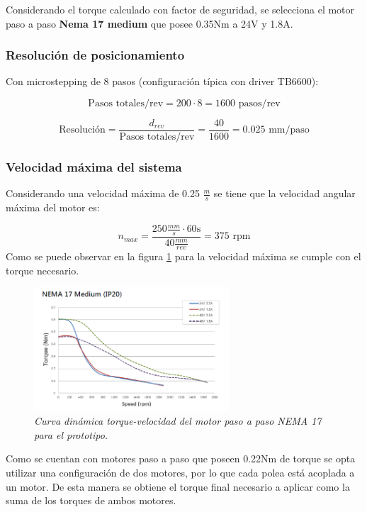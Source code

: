 Considerando el torque calculado con factor de seguridad, se selecciona el motor paso a paso  \textbf{Nema 17 medium} que posee  0.35Nm a 24V y 1.8A. 

\subsubsection{Resolución de posicionamiento}

Con microstepping de 8 pasos (configuración típica con driver TB6600):

\begin{equation}
    \text{Pasos totales/rev} = 200 \cdot 8 = 1600 \text{ pasos/rev}
\end{equation}

\begin{equation}
    \text{Resolución} = \frac{d_{rev}}{\text{Pasos totales/rev}} = \frac{40}{1600} = 0.025 \text{ mm/paso}
\end{equation}

\subsubsection{Velocidad máxima del sistema}

Considerando una velocidad máxima de 0.25 \(\frac{m}{s}\) se tiene que la velocidad angular máxima del motor es:

\begin{equation}
    n_{max} = \frac{250 \frac{mm}{s} \cdot 60 \text {s}}{40 \frac{mm}{rev}} = 375 \text{ rpm}
\end{equation}
Como se puede observar en la figura \ref{fig:Curva_din_nema17medium} para la velocidad máxima se cumple con el torque necesario.
\begin{figure}[H]
    \centering
    \includegraphics[width=0.65\textwidth]{img/nema17_medium.png}
    \caption{\textit{Curva dinámica torque-velocidad del motor paso a paso NEMA 17 para el prototipo.}}
    \label{fig:Curva_din_nema17medium}
\end{figure}
Como se cuentan con motores paso a paso que poseen 0.22Nm de torque se opta utilizar una configuración de dos motores, por lo que cada polea está acoplada a un motor. De esta manera se obtiene el torque final necesario a aplicar como la suma de los torques de ambos motores.